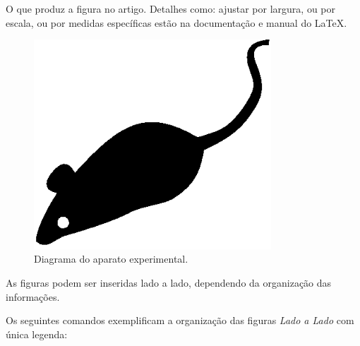 \documentclass[12pt,A4,A4pt]{article}
\begin{document}
{\begin{verbatim}
\end{verbatim}

O que produz a figura no artigo. Detalhes como: ajustar por largura, ou por escala, ou por medidas específicas estão na documentação e manual do \LaTeX.

\begin{figure}[t]
\centering
\includegraphics[width=21pc]{mouse}
\caption{\fontsize{10pt}{\baselineskip}\selectfont Diagrama do aparato experimental.}
\label{fig_env1}
\end{figure}

As figuras podem ser inseridas lado a lado, dependendo da organização das informações.

Os seguintes comandos exemplificam a organização das figuras \textit{Lado a Lado} com única legenda:

\begin{verbatim}
    

\end{verbatim}}
\end{document}
